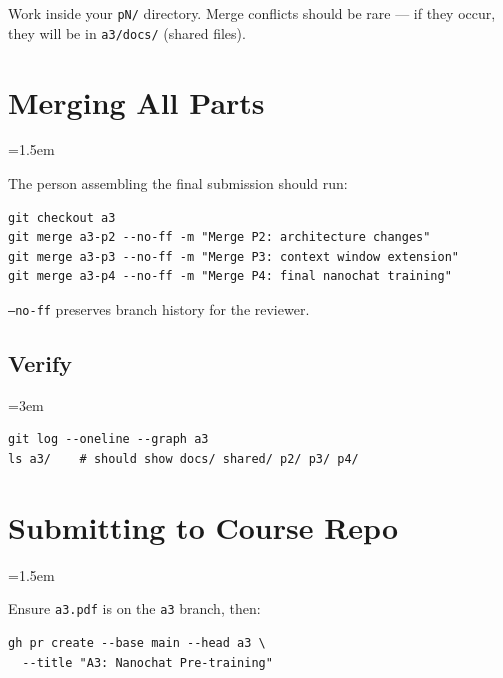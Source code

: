 \documentclass[9pt]{extarticle}
\begin{document}
Work inside your \texttt{pN/} directory. Merge conflicts should be rare --- if they occur, they will be in \texttt{a3/docs/} (shared files).

\leftskip=0pt
\section*{Merging All Parts}
\leftskip=1.5em

The person assembling the final submission should run:

\begin{lstlisting}
git checkout a3
git merge a3-p2 --no-ff -m "Merge P2: architecture changes"
git merge a3-p3 --no-ff -m "Merge P3: context window extension"
git merge a3-p4 --no-ff -m "Merge P4: final nanochat training"
\end{lstlisting}

\texttt{--no-ff} preserves branch history for the reviewer.

\subsection*{Verify}
\leftskip=3em

\begin{lstlisting}
git log --oneline --graph a3
ls a3/    # should show docs/ shared/ p2/ p3/ p4/
\end{lstlisting}

\leftskip=0pt
\section*{Submitting to Course Repo}
\leftskip=1.5em

Ensure \texttt{a3.pdf} is on the \texttt{a3} branch, then:

\begin{lstlisting}
gh pr create --base main --head a3 \
  --title "A3: Nanochat Pre-training"
\end{lstlisting}
\end{document}
